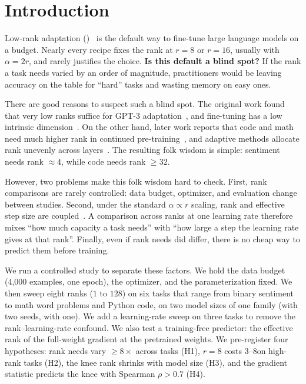 \section{Introduction}
\label{sec:intro}

Low-rank adaptation (\lora)~\citep{hu2021lora} is the default way to fine-tune large language models on a budget. Nearly every recipe fixes the rank at $r{=}8$ or $r{=}16$, usually with $\alpha=2r$, and rarely justifies the choice. {\bf Is this default a blind spot?} If the rank a task needs varied by an order of magnitude, practitioners would be leaving accuracy on the table for ``hard'' tasks and wasting memory on easy ones.

There are good reasons to suspect such a blind spot. The original \lora work found that very low ranks suffice for GPT-3 adaptation~\citep{hu2021lora}, and fine-tuning has a low intrinsic dimension~\citep{aghajanyan2020intrinsic}. On the other hand, later work reports that code and math need much higher rank in continued pre-training~\citep{biderman2024lora}, and adaptive methods allocate rank unevenly across layers~\citep{zhang2023adalora}. The resulting folk wisdom is simple: sentiment needs rank $\approx 4$, while code needs rank $\geq 32$.

However, two problems make this folk wisdom hard to check. First, rank comparisons are rarely controlled: data budget, optimizer, and evaluation change between studies. Second, under the standard $\alpha \propto r$ scaling, rank and effective step size are coupled~\citep{kalajdzievski2023rslora}. A comparison across ranks at one learning rate therefore mixes ``how much capacity a task needs'' with ``how large a step the learning rate gives at that rank''. Finally, even if rank needs did differ, there is no cheap way to predict them before training.

We run a controlled study to separate these factors. We hold the data budget (4,000 examples, one epoch), the optimizer, and the \lora parameterization fixed. We then sweep eight ranks ($1$ to $128$) on six tasks that range from binary sentiment to math word problems and Python code, on two model sizes of one family (\qsmall with two seeds, \qlarge with one). We add a learning-rate sweep on three tasks to remove the rank--learning-rate confound. We also test a training-free predictor: the effective rank of the full-weight gradient at the pretrained weights. We pre-register four hypotheses: rank needs vary $\geq 8\times$ across tasks (H1), $r{=}8$ costs 3--8\pp on high-rank tasks (H2), the knee rank shrinks with model size (H3), and the gradient statistic predicts the knee with Spearman $\rho > 0.7$ (H4).

